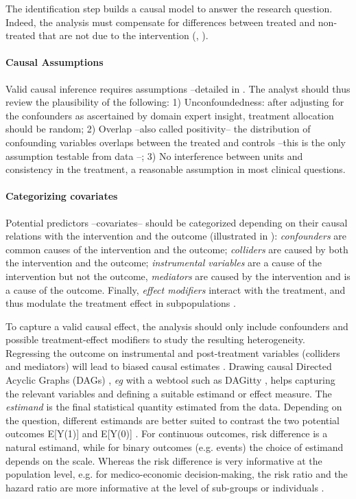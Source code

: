 \documentclass[10pt,letterpaper]{article}
\begin{document}
The identification step builds a causal model to answer the research question.
%
Indeed, the analysis must compensate for differences between
treated and non-treated that are not due to the intervention
(\cite[chapter~1]{pearl2018book},
\cite[chapter~1]{hernan2020causal}).

\paragraph{Causal Assumptions}

Valid causal inference requires assumptions  \cite{rubin2005causal} --detailed
in . The analyst should thus review the
plausibility of the following: 1) Unconfoundedness: after adjusting for the
confounders as ascertained by domain expert insight, treatment allocation should
be random; 2) Overlap --also called positivity-- the distribution of confounding
variables overlaps between the treated and controls --this is the only
assumption testable from data \cite{austin2015moving}--; 3) No interference
between units and consistency in the treatment, a reasonable assumption in most
clinical questions.

\paragraph{Categorizing covariates}
%
Potential predictors --covariates-- should be categorized depending on their
causal relations with the intervention and the outcome (illustrated in
): \emph{confounders} are common causes of the
intervention and the outcome; \emph{colliders} are caused by both the
intervention and the outcome; \emph{instrumental variables} are a cause of the
intervention but not the outcome, \emph{mediators} are caused by the
intervention and is a cause of the outcome. Finally, \emph{effect modifiers}
interact with the treatment, and thus
modulate the treatment effect in subpopulations \cite{attia2022proposal}.

To capture a valid causal effect, the analysis should only include confounders
and possible treatment-effect modifiers to study the resulting heterogeneity.
Regressing the outcome on instrumental and post-treatment variables (colliders
and mediators) will lead to biased causal estimates
\cite{vanderweele2019principles}. Drawing causal Directed Acyclic Graphs
(DAGs) \cite{greenland1999causal}, \emph{eg} with a webtool such as DAGitty \cite{textor2011dagitty}, helps capturing the relevant
variables and defining a suitable estimand or effect measure. The
\emph{estimand} is the final statistical quantity estimated from the data.
Depending on the question, different estimands are better suited to contrast
the two potential outcomes E[Y(1)] and E[Y(0)] \cite{imbens_nonparametric_2004,colnet2023risk}. For continuous outcomes, risk
difference is a natural estimand, while for binary outcomes (e.g. events) the
choice of estimand depends on the scale. Whereas the risk difference is very
informative at the population level, e.g. for medico-economic decision-making,
the risk ratio and the hazard ratio are more informative at the level of
sub-groups or individuals \cite{colnet2023risk}.
\end{document}
